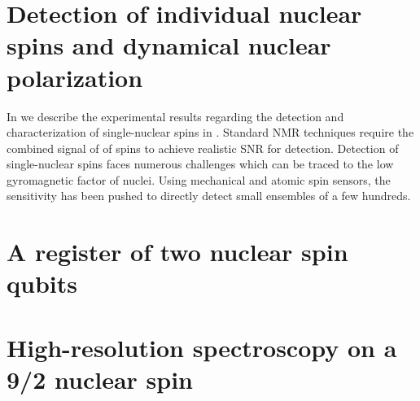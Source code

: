 \section{Detection of individual nuclear spins and dynamical nuclear polarization}

In  we describe the experimental results regarding the detection and characterization of single-nuclear spins in \Ca. Standard NMR techniques require the combined signal of  of spins to achieve realistic SNR for detection. Detection of single-nuclear spins faces numerous challenges which can be traced to the low gyromagnetic factor of nuclei. 
Using mechanical and atomic spin sensors, the sensitivity has been pushed to directly detect small ensembles of a few hundreds. 
 

\section{A register of two nuclear spin qubits}


\section{High-resolution spectroscopy on a 9/2 nuclear spin}



